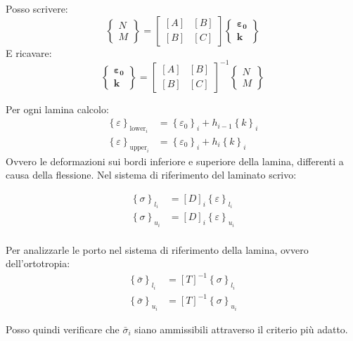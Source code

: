 Posso scrivere:
\begin{equation*}
\left\{
\begin{array}{c}
N\\M
\end{array}
\right\}
=
\begin{bmatrix}
[A] & [B] \\
[B] & [C]
\end{bmatrix}
\left\{
\begin{array}{c}
\boldsymbol{\varepsilon_0}\\
\boldsymbol{k}
\end{array}
\right\}
\end{equation*}
E ricavare:
\begin{equation*}
\left\{
\begin{array}{c}
\boldsymbol{\varepsilon_0}\\
\boldsymbol{k}
\end{array}
\right\}= \begin{bmatrix}
[A] & [B] \\
[B] & [C]
\end{bmatrix}^{-1}
\left\{
\begin{array}{c}
N\\M
\end{array}
\right\}
\end{equation*}


Per ogni lamina calcolo:
\begin{align*}
     \left\{\varepsilon\right\}_{\text{lower}_i} &=    \left\{\varepsilon_0\right\}_i+     h_{i-1}  \left\{k\right\}_i\\
       \left\{\varepsilon\right\}_{\text{upper}_i} &=    \left\{\varepsilon_0\right\}_i+     h_{i}  \left\{k\right\}_i
\end{align*}
Ovvero le deformazioni sui bordi inferiore e superiore della lamina, differenti a causa della flessione. Nel sistema di riferimento del laminato scrivo:

\begin{align*}
     \left\{\sigma\right\}_{l_i} &= [D]_i \left\{\varepsilon\right\}_{l_i}\\
     \left\{\sigma\right\}_{u_i} &= [D]_i \left\{\varepsilon\right\}_{u_i}\\
\end{align*}

Per analizzarle le porto nel sistema di riferimento della lamina, ovvero dell'ortotropia:
\begin{align*}
     \left\{\bar{\sigma}\right\}_{l_i} &= [T]^{-1}  \left\{\sigma\right\}_{l_i}\\
     \left\{\bar{\sigma}\right\}_{u_i} &= [T]^{-1}   \left\{\sigma\right\}_{u_i}
\end{align*}

Posso quindi verificare che $\bar{\sigma}_i$ siano ammissibili attraverso il criterio più adatto.
